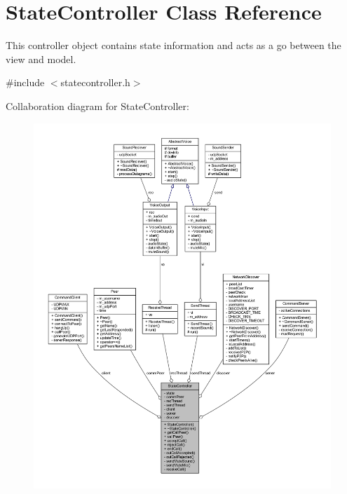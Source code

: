 \hypertarget{class_state_controller}{
\section{\-State\-Controller \-Class \-Reference}
\label{class_state_controller}
}


\-This controller object contains state information and acts as a go between the view and model.  




{\ttfamily \#include $<$statecontroller.\-h$>$}



\-Collaboration diagram for \-State\-Controller\-:\nopagebreak
\begin{figure}[H]
\begin{center}
\leavevmode
\includegraphics[width=350pt]{class_state_controller__coll__graph}
\end{center}
\end{figure}
